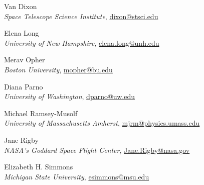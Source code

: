 \noindent Van Dixon\\
\indent \emph{Space Telescope Science Institute}, \href{mailto:dixon@stsci.edu}{dixon@stsci.edu}\vspace*{\baselineskip}

\noindent Elena Long\\
\indent \emph{University of New Hampshire}, \href{mailto:elena.long@unh.edu}{elena.long@unh.edu}\vspace*{\baselineskip}

\newpage
\noindent Merav Opher\\
\indent \emph{Boston University}, \href{mailto:mopher@bu.edu}{mopher@bu.edu}\vspace*{\baselineskip}

\noindent Diana Parno\\
\indent \emph{University of Washington}, \href{mailto:dparno@uw.edu}{dparno@uw.edu}\vspace*{\baselineskip}

\noindent Michael Ramsey-Musolf\\
\indent \emph{University of Massachusetts Amherst}, \href{mailto:mjrm@physics.umass.edu}{mjrm@physics.umass.edu}\vspace*{\baselineskip}

\noindent Jane Rigby\\
\indent \emph{NASA's Goddard Space Flight Center}, \href{mailto:Jane.Rigby@nasa.gov}{Jane.Rigby@nasa.gov}\vspace*{\baselineskip}

\noindent Elizabeth H. Simmons\\
\indent \emph{Michigan State University}, \href{mailto:esimmons@msu.edu}{esimmons@msu.edu}